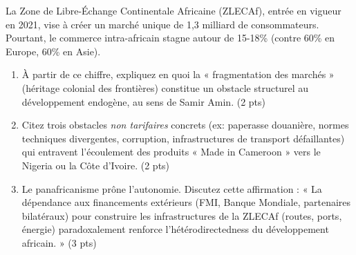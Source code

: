 \documentclass[11pt]{article}
\begin{document}
\begin{exercice}
    La Zone de Libre-Échange Continentale Africaine (ZLECAf), entrée en vigueur en 2021, vise à créer un marché unique de 1,3 milliard de consommateurs. Pourtant, le commerce intra-africain stagne autour de 15-18\% (contre 60\% en Europe, 60\% en Asie).

    \begin{enumerate}
        \item À partir de ce chiffre, expliquez en quoi la « fragmentation des marchés » (héritage colonial des frontières) constitue un obstacle structurel au développement endogène, au sens de Samir Amin. (2 pts)
        \item Citez trois obstacles \textit{non tarifaires} concrets (ex: paperasse douanière, normes techniques divergentes, corruption, infrastructures de transport défaillantes) qui entravent l'écoulement des produits « Made in Cameroon » vers le Nigeria ou la Côte d'Ivoire. (2 pts)
        \item Le panafricanisme prône l'autonomie. Discutez cette affirmation : « La dépendance aux financements extérieurs (FMI, Banque Mondiale, partenaires bilatéraux) pour construire les infrastructures de la ZLECAf (routes, ports, énergie) paradoxalement renforce l'hétérodirectedness du développement africain. » (3 pts)
    \end{enumerate}
\end{exercice}
\end{document}
